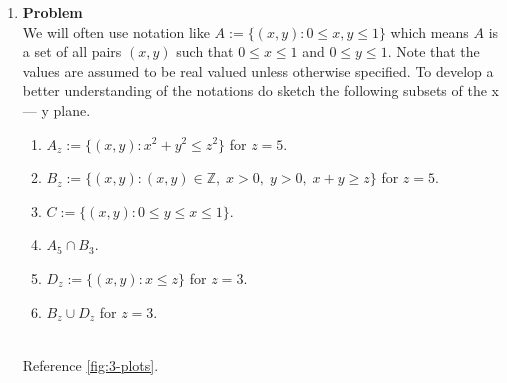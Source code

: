 \documentclass[12pt]{article}
\newenvironment{Ex}{\textbf{Problem}\vspace{.75em}\\}{}
\begin{document}
\begin{enumerate}
\begin{Ex}
\begin{solution}
\begin{enumerate}
      \item This assumes that the sum of both power subcells $a,b$
        fall within the range $(5,6)$. Reference \cref{fig:power-fig}
        for a graphical representation. The event is the shaded region
        between the two curves, calculated to be $3.5/25$, or $0.14$.
        \begin{figure}[hbt]
          \centering
          
          \caption{A graphical representation of the event requirements}
          \label{fig:power-fig}
        \end{figure}
      \end{enumerate}
    \end{solution}
  \end{Ex}
\item 
  \begin{Ex}
    We will often use notation like $A:=\{(x,y) : 0 \le x, y\le 1\}$
    which means $A$ is a set of all pairs $(x,y)$ such that $0\le x\le
    1$ and $0 \le y \le 1$. Note that the values are assumed to be
    real valued unless otherwise specified. To develop a better
    understanding of the notations do sketch the following subsets of
    the x --- y plane.
    \begin{enumerate}
    \item $A_z := \{(x,y) : x^2+y^2 \le z^2\}$ for $z=5$.
    \item $B_z := \{(x,y) : (x,y) \in \mathbb{Z},\; x>0,\; y>0,\; x+y\ge z\}$ for $z=5$.
    \item $C := \{(x,y) : 0 \le y \le x \le 1\}$.
    \item $A_5 \cap B_3$.
    \item $D_z :=\{(x,y) : x \le z\}$ for $z=3$.
    \item $B_z \cup D_z$ for $z=3$.
    \end{enumerate}
    \begin{solution} \hfill\\\vspace{1.5em}
      Reference \cref{fig:3-plots}.
      \begin{figure}[hbt]
        \centering
        \begin{subfigure}[b]{0.45\textwidth}
          \resizebox{\textwidth}{!}{}
        \end{subfigure}
        \begin{subfigure}[b]{0.45\textwidth}
          \resizebox{\textwidth}{!}{}
        \end{subfigure}
        \begin{subfigure}[b]{0.45\textwidth}

\end{subfigure}
\end{figure}
\end{solution}
\end{Ex}
\end{enumerate}
\end{document}
